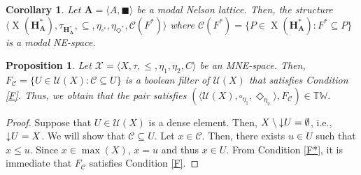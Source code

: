 \documentclass[pdflatex,sn-mathphys-num]{sn-jnl}%
\newtheorem{corollary}{Corollary}
\newcommand{\A}{\mathbf{A}}
\newcommand{\He}{\mathbf{H}}
\newcommand{\X}[1]{\operatorname{X}(#1)}
\newcommand{\da}[1]{\operatorname{\downarrow}\hspace{-0.5mm}{#1}}
\theoremstyle{thmstyleone}%
\newtheorem{proposition}[theorem]{Proposition}%
\theoremstyle{thmstyletwo}%
\theoremstyle{thmstylethree}%
\begin{document}
\begin{corollary}\label{asMEN-space}
    Let $\A=\langle A,\blacksquare\rangle$ be a modal Nelson lattice. Then, the structure $\langle \X{\He_\mathbf{A}^*},\tau_{\He_{\mathbf{A}}^*},\subseteq,\eta_{\square^*},\eta_{\Diamond^*},\mathcal{C}(F^*)\rangle$ where $\mathcal{C}(F^*)=\{P\in \X{\He_\mathbf{A}^*}:F^*\subseteq P\}$ is a modal NE-space. 
\end{corollary}

\begin{proposition}
    Let $\mathcal{X} = \langle X, \tau, \leq,\eta_1, \eta_2, C\rangle$ be an MNE-space. Then, $F_\mathcal{C}=\{U\in\mathcal{U}(X):\mathcal{C}\subseteq U\}$ is a boolean filter of $\mathcal{U}(X)$ that satisfies Condition \eqref{F}. Thus, we obtain that the pair satisfies $(\langle\mathcal{U}(X),\square_{\eta_1},\Diamond_{\eta_2}\rangle,F_\mathcal{C})\in \mathbb{TW}$.
\end{proposition}
\begin{proof}
    Suppose that $U\in\mathcal{U}(X)$ is a dense element. Then, $X\setminus\da{U}=\emptyset$, i.e., $\da{U}=X$. We will show that $\mathcal{C}\subseteq U$. Let $x\in \mathcal{C}$. Then, there exists $u\in U$ such that $x\leq u$. Since $x\in\max(X)$, $x=u$ and thus $x\in U$. From Condition \ref{F*}, it is immediate that $F_\mathcal{C}$ satisfies Condition \eqref{F}.
\end{proof}
\end{document}
